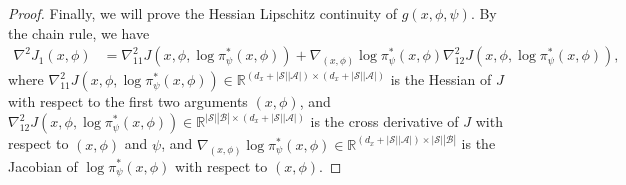 \documentclass{article}
\theoremstyle{plain}
\theoremstyle{definition}
\theoremstyle{remark}
\def\R{\mathbb R}
\def\cA{\mathcal A}
\def\cB{\mathcal B}
\def\cS{\mathcal S}
\begin{document}
\begin{proof}
    Finally, we will prove the Hessian Lipschitz continuity of $g(x,\phi,\psi)$. 
    By the chain rule, we have
    \begin{align}
        \nabla^2 J_1(x,\phi) & = \nabla^2_{11} J(x,\phi,\log \pi_\psi^*(x,\phi)) + \nabla_{(x,\phi)} \log \pi_\psi^*(x,\phi)\nabla^2_{12} J(x,\phi,\log \pi_\psi^*(x,\phi))  ,
    \end{align}
    where $\nabla^2_{11} J(x,\phi,\log \pi_\psi^*(x,\phi)) \in \R^{(d_x+|\cS||\cA|) \times (d_x+|\cS||\cA|)}$ is the Hessian of $J$ with respect to the first two arguments $(x,\phi)$, and $\nabla^2_{12} J(x,\phi,\log \pi_\psi^*(x,\phi)) \in \R^{ |\cS||\cB| \times (d_x+|\cS||\cA|) }$ is the cross derivative of $J$ with respect to $(x,\phi)$ and $\psi$, and $\nabla_{(x,\phi)} \log \pi_\psi^*(x,\phi) \in \R^{(d_x+|\cS||\cA|) \times |\cS||\cB| }$ is the Jacobian of $\log \pi_\psi^*(x,\phi)$ with respect to $(x,\phi)$.


\end{proof}
\end{document}
